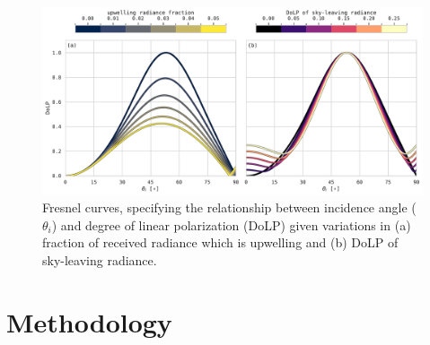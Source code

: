 \documentclass[letterpaper,journal]{IEEEtran}
\begin{document}
\begin{figure}[!ht]
\centering
\includegraphics[width=\textwidth]{_figures/mueller_calc_example.pdf}
\vspace{-20pt}
\caption{Fresnel curves, specifying the relationship between incidence angle ($\theta_i$) and degree of linear polarization (DoLP) given variations in (a) fraction of received radiance which is upwelling and (b) DoLP of sky-leaving radiance.}
\label{fig:mueller_calc_example}
\end{figure}

\section{Methodology}
\label{sec:methodology}
\end{document}
